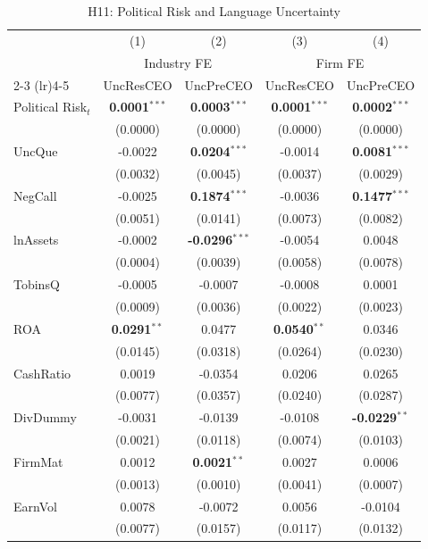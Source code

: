 \begin{landscape}
\begin{table}[H]
\setlength{\tabcolsep}{3pt}
\renewcommand{\arraystretch}{0.85}
\centering
\caption{H11: Political Risk and Language Uncertainty}
\label{tab:h11_prisk_uncertainty}
\scriptsize
\begin{tabular}{lcccc}
\toprule
 & (1) & (2) & (3) & (4) \\
 & \multicolumn{2}{c}{Industry FE} & \multicolumn{2}{c}{Firm FE} \\
\cmidrule(lr){2-3} \cmidrule(lr){4-5}
 & UncResCEO & UncPreCEO & UncResCEO & UncPreCEO \\
\midrule
Political Risk$_{t}$ & \textbf{0.0001}$^{***}$ & \textbf{0.0003}$^{***}$ & \textbf{0.0001}$^{***}$ & \textbf{0.0002}$^{***}$ \\
 & (0.0000) & (0.0000) & (0.0000) & (0.0000) \\
\midrule
UncQue & -0.0022 & \textbf{0.0204}$^{***}$ & -0.0014 & \textbf{0.0081}$^{***}$ \\
 & (0.0032) & (0.0045) & (0.0037) & (0.0029) \\
NegCall & -0.0025 & \textbf{0.1874}$^{***}$ & -0.0036 & \textbf{0.1477}$^{***}$ \\
 & (0.0051) & (0.0141) & (0.0073) & (0.0082) \\
lnAssets & -0.0002 & \textbf{-0.0296}$^{***}$ & -0.0054 & 0.0048 \\
 & (0.0004) & (0.0039) & (0.0058) & (0.0078) \\
TobinsQ & -0.0005 & -0.0007 & -0.0008 & 0.0001 \\
 & (0.0009) & (0.0036) & (0.0022) & (0.0023) \\
ROA & \textbf{0.0291}$^{**}$ & 0.0477 & \textbf{0.0540}$^{**}$ & 0.0346 \\
 & (0.0145) & (0.0318) & (0.0264) & (0.0230) \\
CashRatio & 0.0019 & -0.0354 & 0.0206 & 0.0265 \\
 & (0.0077) & (0.0357) & (0.0240) & (0.0287) \\
DivDummy & -0.0031 & -0.0139 & -0.0108 & \textbf{-0.0229}$^{**}$ \\
 & (0.0021) & (0.0118) & (0.0074) & (0.0103) \\
FirmMat & 0.0012 & \textbf{0.0021}$^{**}$ & 0.0027 & 0.0006 \\
 & (0.0013) & (0.0010) & (0.0041) & (0.0007) \\
EarnVol & 0.0078 & -0.0072 & 0.0056 & -0.0104 \\
 & (0.0077) & (0.0157) & (0.0117) & (0.0132) \\

\end{tabular}
\end{table}
\end{landscape}
